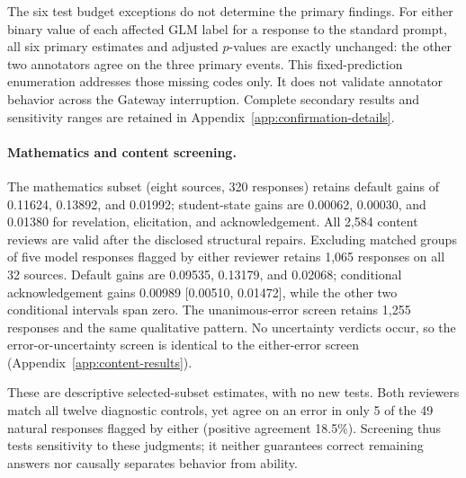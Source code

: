 The six test budget exceptions do not determine the primary findings.
For either binary value of each affected GLM label for a response to the standard prompt, all six primary
estimates and adjusted $p$-values are exactly unchanged: the other two annotators
agree on the three primary events. This fixed-prediction enumeration addresses
those missing codes only. It does not validate annotator behavior across the
Gateway interruption. Complete secondary results and sensitivity ranges are
retained in Appendix~\ref{app:confirmation-details}.

\paragraph{Mathematics and content screening.}
The mathematics subset (eight sources, 320 responses) retains default gains
of 0.11624, 0.13892, and 0.01992; student-state gains are 0.00062,
0.00030, and 0.01380 for revelation, elicitation, and acknowledgement.
All 2,584 content reviews are valid after the disclosed structural repairs.
Excluding matched groups of five model responses flagged by either reviewer retains 1,065 responses
on all 32 sources. Default gains are 0.09535, 0.13179, and 0.02068;
conditional acknowledgement gains 0.00989 [0.00510, 0.01472], while the
other two conditional intervals span zero. The unanimous-error screen retains
1,255 responses and the same qualitative pattern. No uncertainty verdicts
occur, so the error-or-uncertainty screen is identical to the either-error
screen (Appendix~\ref{app:content-results}).

These are descriptive selected-subset estimates, with no new tests. Both
reviewers match all twelve diagnostic controls, yet agree on an error in only
5 of the 49 natural responses flagged by either (positive agreement 18.5\%).
Screening thus tests sensitivity to these judgments; it neither guarantees
correct remaining answers nor causally separates behavior from ability.
